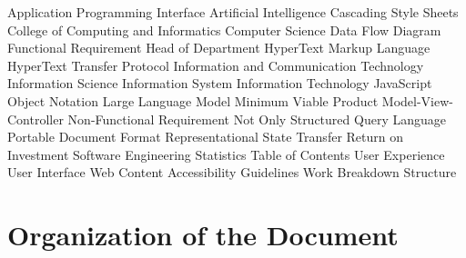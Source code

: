 \documentclass[12pt, a4paper]{article}
\begin{document}
\begin{acronym}[WCAG]  %
     {Application Programming Interface}
      {Artificial Intelligence}
     {Cascading Style Sheets}
     {College of Computing and Informatics}
      {Computer Science}
     {Data Flow Diagram}
      {Functional Requirement}
     {Head of Department}
    {HyperText Markup Language}
    {HyperText Transfer Protocol}
     {Information and Communication Technology}
     {Information Science}
      {Information System}
      {Information Technology}
    {JavaScript Object Notation}
     {Large Language Model}
     {Minimum Viable Product}
     {Model-View-Controller}
     {Non-Functional Requirement}
   {Not Only Structured Query Language}
     {Portable Document Format}
    {Representational State Transfer}
     {Return on Investment}
     {Software Engineering}
    {Statistics}
     {Table of Contents}
      {User Experience}
      {User Interface}
    {Web Content Accessibility Guidelines}
     {Work Breakdown Structure}
\end{acronym}

\newpage
\tableofcontents
\newpage

\listoftables
{}
\newpage

\listoffigures
{}
\newpage

\section*{Organization of the Document}
\end{document}
